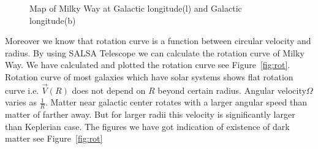 \documentclass[conference]{IEEEtran}
\begin{document}
\begin{figure}[!t]
{\label{fig_fourth_case}}
\hfil
{}
\hfil
{}
\hfil
{}
\hfil
{}
\hfil
\caption{Map of Milky Way at Galactic longitude(l) and Galactic longitude(b)}
\label{fig:map}
\end{figure}

Moreover we know that rotation curve is a function between circular velocity and radius. By using SALSA Telescope we can calculate the rotation curve of Milky Way\cite{CathyHorellou2015}. We have calculated and plotted the rotation curve see Figure~\ref{fig:rot}. Rotation curve of most galaxies which have solar systems shows flat rotation curve i.e. $\vec{V}(\mathit{R})$ does not depend on $\mathit{R}$ beyond certain radius. Angular velocity$\Omega$ varies as $\frac{1}{\mathit{R}}$. Matter near galactic center rotates with a larger angular speed than matter of farther away. But for larger radii this velocity is significantly larger than Keplerian case\cite{CathyHorellou2015}. The figures we have got indication of existence of dark matter see Figure~\ref{fig:rot}
\end{document}
